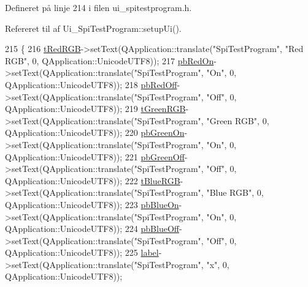 Defineret på linje 214 i filen ui\+\_\+spitestprogram.\+h.



Refereret til af Ui\+\_\+\+Spi\+Test\+Program\+::setup\+Ui().


\begin{DoxyCode}
215     \{
216         \hyperlink{class_ui___spi_test_program_a44f9277d36451995887541d6e333c772}{tRedRGB}->setText(QApplication::translate(\textcolor{stringliteral}{"SpiTestProgram"}, \textcolor{stringliteral}{"Red RGB"}, 0, 
      QApplication::UnicodeUTF8));
217         \hyperlink{class_ui___spi_test_program_a58972344360380ab7a3cedec6de9fb0d}{pbRedOn}->setText(QApplication::translate(\textcolor{stringliteral}{"SpiTestProgram"}, \textcolor{stringliteral}{"On"}, 0, 
      QApplication::UnicodeUTF8));
218         \hyperlink{class_ui___spi_test_program_ad6661caed9d7154252ff188ea62e538c}{pbRedOff}->setText(QApplication::translate(\textcolor{stringliteral}{"SpiTestProgram"}, \textcolor{stringliteral}{"Off"}, 0, 
      QApplication::UnicodeUTF8));
219         \hyperlink{class_ui___spi_test_program_a56e39ae0021a6fba651282c09e6d38da}{tGreenRGB}->setText(QApplication::translate(\textcolor{stringliteral}{"SpiTestProgram"}, \textcolor{stringliteral}{"Green RGB"}, 0, 
      QApplication::UnicodeUTF8));
220         \hyperlink{class_ui___spi_test_program_aa00d405e11fadc9dd8d0b7aae2632903}{pbGreenOn}->setText(QApplication::translate(\textcolor{stringliteral}{"SpiTestProgram"}, \textcolor{stringliteral}{"On"}, 0, 
      QApplication::UnicodeUTF8));
221         \hyperlink{class_ui___spi_test_program_ad4aa6f2ff845832ee96f6158c85bbfba}{pbGreenOff}->setText(QApplication::translate(\textcolor{stringliteral}{"SpiTestProgram"}, \textcolor{stringliteral}{"Off"}, 0, 
      QApplication::UnicodeUTF8));
222         \hyperlink{class_ui___spi_test_program_a24f37f517fcdcba9802de32d4cb7cd2a}{tBlueRGB}->setText(QApplication::translate(\textcolor{stringliteral}{"SpiTestProgram"}, \textcolor{stringliteral}{"Blue RGB"}, 0, 
      QApplication::UnicodeUTF8));
223         \hyperlink{class_ui___spi_test_program_a3f13697eb9ebac3370cf5b1456bb2ab6}{pbBlueOn}->setText(QApplication::translate(\textcolor{stringliteral}{"SpiTestProgram"}, \textcolor{stringliteral}{"On"}, 0, 
      QApplication::UnicodeUTF8));
224         \hyperlink{class_ui___spi_test_program_add50c8a20a19c966af33418b767fb815}{pbBlueOff}->setText(QApplication::translate(\textcolor{stringliteral}{"SpiTestProgram"}, \textcolor{stringliteral}{"Off"}, 0, 
      QApplication::UnicodeUTF8));
225         \hyperlink{class_ui___spi_test_program_a22925632964060df176ccbc0de5fa511}{label}->setText(QApplication::translate(\textcolor{stringliteral}{"SpiTestProgram"}, \textcolor{stringliteral}{"x"}, 0, QApplication::UnicodeUTF8));

\end{DoxyCode}
